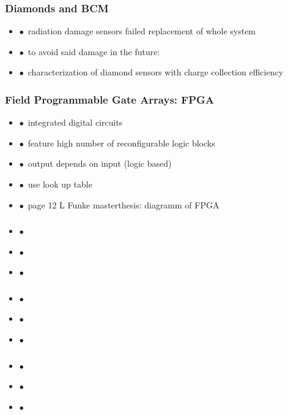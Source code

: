 \documentclass[aspectratio=1610, 12pt, xcolor=dvipsnames]{beamer}
\begin{document}
\begin{frame}\frametitle{Diamonds and BCM}
  \begin{itemize}
    \item $\bullet$\, radiation damage \to sensors failed \to replacement of whole system
    \item $\bullet$\, to avoid said damage in the future:
    \item $\bullet$\, \to characterization of diamond sensors with charge collection efficiency
  \end{itemize}
\end{frame}

\begin{frame}\frametitle{Field Programmable Gate Arrays: FPGA}
  \begin{itemize}
    \item $\bullet$\, integrated digital circuits
    \item $\bullet$\, feature high number of reconfigurable logic blocks
    \item $\bullet$\, output depends on input (logic based)
    \item $\bullet$\, use look up table
    \item $\bullet$\, page 12 L Funke masterthesis: diagramm of FPGA
  \end{itemize}
\end{frame}

\begin{frame}\frametitle{}
  \begin{itemize}
    \item $\bullet$\,
    \item $\bullet$\,
    \item $\bullet$\,
  \end{itemize}
\end{frame}

\begin{frame}\frametitle{}
  \begin{itemize}
    \item $\bullet$\,
    \item $\bullet$\,
    \item $\bullet$\,
  \end{itemize}
\end{frame}

\begin{frame}\frametitle{}
  \begin{itemize}
    \item $\bullet$\,
    \item $\bullet$\,
    \item $\bullet$\,
  \end{itemize}
\end{frame}
\end{document}
